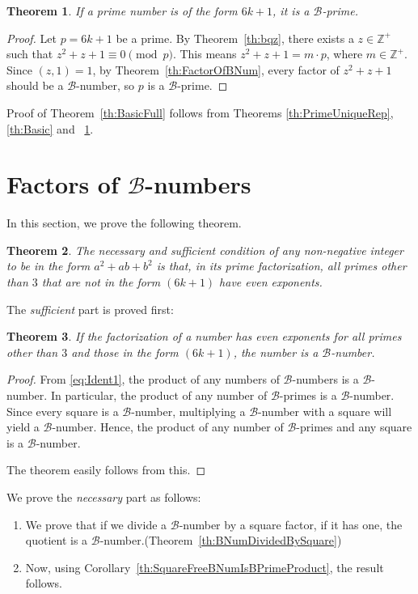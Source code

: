 \documentclass[reqno]{amsart}
\newtheorem{theorem}{Theorem}
\newcommand{\bnum}   {\ensuremath{\mathcal B}-number}
\newcommand{\bprime} {\ensuremath{\mathcal B}-prime}
\newcommand{\congr}[3]{{\ensuremath{{#1} \equiv {#2}
      \pmod{#3}}}}
\newcommand{\bq}[2]{\ensuremath{{#1}^2 + {#1}{#2} + {#2}^2}}
\newcommand{\bqz}[1]{{\ensuremath{{#1}^2 + {#1} + 1}}}
\newcommand{\bqab}{\bq{a}{b}}
\newcommand{\Positive}{\ensuremath{\mathbb{Z^+}}}
\begin{document}
\begin{theorem}
  \label{th:BasicConv}
  If a prime number is of the form $6k+1$, it is a \bprime.
\end{theorem}
\begin{proof}
  Let $p = 6k+1$ be a prime.  By Theorem~\ref{th:bqz}, there
  exists a $z \in \Positive$  such that
  \congr{\bqz{z}}{0}{p}.  This means $\bqz{z} = m \cdot
  p$, where $m \in \Positive$.  Since $(z,1) = 1$, by Theorem~\ref{th:FactorOfBNum}, every factor of
  \bqz{z} should be a \bnum{}, so $p$ is a \bprime.
\end{proof}

Proof of Theorem~\ref{th:BasicFull} follows from
Theorems \ref{th:PrimeUniqueRep}, \ref{th:Basic} and
~\ref{th:BasicConv}.

\section{Factors of \bnum{}s}
In this section, we prove the following theorem.

\begin{theorem}
  \label{th:BNumFactorization}
  The necessary and sufficient condition of any
  non-negative integer to be in the form \bqab{} is
  that, in its prime factorization, all primes other
  than $3$ that are
  not in the form $(6k+1)$ have even exponents.
\end{theorem}

The {\em sufficient} part is proved first:

\begin{theorem}
  \label{th:BNumFactorization1}
  If the factorization of a number has even exponents
  for all primes other than $3$ and those in the form
  $(6k+1)$, the number is a \bnum.
\end{theorem}
\begin{proof}
  From \eqref{eq:Ident1}, the product of any numbers
    of \bnum{}s is a \bnum{}.  In particular, the product of
    any number of \bprime{}s is a \bnum.
  Since every square is a \bnum{}, multiplying a
    \bnum{} with a square will yield a \bnum.
  Hence, the product of any number of \bprime{}s and
    any square is a \bnum.

The theorem easily follows from this.
\end{proof}

We prove the {\em necessary} part as follows:

\begin{enumerate}
\item We prove that if we divide a \bnum{} by a square
  factor, if it has one, the quotient is a \bnum.(Theorem~\ref{th:BNumDividedBySquare})
\item Now, using
  Corollary~\ref{th:SquareFreeBNumIsBPrimeProduct}, the
  result follows.
\end{enumerate}
\end{document}
